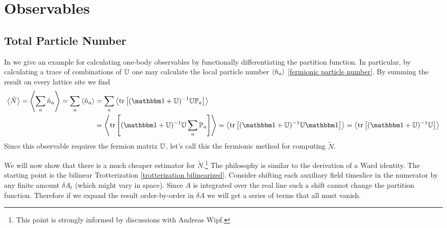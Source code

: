 \section{Observables}\label{sec:observables}

\subsection{Total Particle Number}\label{sec:number}

In  we give an example for calculating one-body observables by functionally differentiating the partition function.
In particular, by calculating a trace of combinations of $\mathbb{U}$ one may calculate the local particle number $\left\langle \tilde{n}_a \right\rangle$ \eqref{fermionic particle number}.
By summing the result on every lattice site we find
\begin{align}
	\expectation{\tilde{N}}
	=
	\expectation{\sum_a \tilde{n}_a}
	=
	\sum_a \expectation{\tilde{n}_a}
	&=
	\sum_a \expectation{\tr{(\one+\UU)\inverse \UU \PP_a}}
	\nonumber\\
	&=
	\expectation{\tr{(\one+\UU)\inverse \UU \sum_a \PP_a}}
	=
	\expectation{\tr{(\one+\UU)\inverse \UU \one}}
	=
	\expectation{\tr{(\one+\UU)\inverse \UU}}
	\label{eq:fermionic total number}
\end{align}
Since this observable requires the fermion matrix $\mathbb{U}$, let's call this the fermionic method for computing $\tilde{N}$.

We will now show that there is a much cheaper estimator for $\tilde{N}$.\footnote{This point is strongly informed by discussions with Andreas Wipf.}
The philosophy is similar to the derivation of a Ward identity.
The starting point is the bilinear Trotterization \eqref{trotterization bilinearized}.
Consider shifting each auxiliary field timeslice in the numerator by any finite amount $\delta A_t$ (which might vary in space).
Since $A$ is integrated over the real line such a shift cannot change the partition function.
Therefore if we expand the result order-by-order in $\delta A$ we will get a series of terms that all must vanish.

